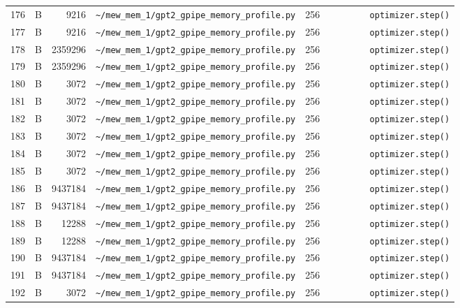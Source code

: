\documentclass{article}
\begin{document}
\begin{longtable}{r l r p{6.5cm} r p{7.0cm}}
176 & B & 9216 & \lstinline|~/mew_mem_1/gpt2_gpipe_memory_profile.py| & 256 & \lstinline|        optimizer.step()| \\
177 & B & 9216 & \lstinline|~/mew_mem_1/gpt2_gpipe_memory_profile.py| & 256 & \lstinline|        optimizer.step()| \\
178 & B & 2359296 & \lstinline|~/mew_mem_1/gpt2_gpipe_memory_profile.py| & 256 & \lstinline|        optimizer.step()| \\
179 & B & 2359296 & \lstinline|~/mew_mem_1/gpt2_gpipe_memory_profile.py| & 256 & \lstinline|        optimizer.step()| \\
180 & B & 3072 & \lstinline|~/mew_mem_1/gpt2_gpipe_memory_profile.py| & 256 & \lstinline|        optimizer.step()| \\
181 & B & 3072 & \lstinline|~/mew_mem_1/gpt2_gpipe_memory_profile.py| & 256 & \lstinline|        optimizer.step()| \\
182 & B & 3072 & \lstinline|~/mew_mem_1/gpt2_gpipe_memory_profile.py| & 256 & \lstinline|        optimizer.step()| \\
183 & B & 3072 & \lstinline|~/mew_mem_1/gpt2_gpipe_memory_profile.py| & 256 & \lstinline|        optimizer.step()| \\
184 & B & 3072 & \lstinline|~/mew_mem_1/gpt2_gpipe_memory_profile.py| & 256 & \lstinline|        optimizer.step()| \\
185 & B & 3072 & \lstinline|~/mew_mem_1/gpt2_gpipe_memory_profile.py| & 256 & \lstinline|        optimizer.step()| \\
186 & B & 9437184 & \lstinline|~/mew_mem_1/gpt2_gpipe_memory_profile.py| & 256 & \lstinline|        optimizer.step()| \\
187 & B & 9437184 & \lstinline|~/mew_mem_1/gpt2_gpipe_memory_profile.py| & 256 & \lstinline|        optimizer.step()| \\
188 & B & 12288 & \lstinline|~/mew_mem_1/gpt2_gpipe_memory_profile.py| & 256 & \lstinline|        optimizer.step()| \\
189 & B & 12288 & \lstinline|~/mew_mem_1/gpt2_gpipe_memory_profile.py| & 256 & \lstinline|        optimizer.step()| \\
190 & B & 9437184 & \lstinline|~/mew_mem_1/gpt2_gpipe_memory_profile.py| & 256 & \lstinline|        optimizer.step()| \\
191 & B & 9437184 & \lstinline|~/mew_mem_1/gpt2_gpipe_memory_profile.py| & 256 & \lstinline|        optimizer.step()| \\
192 & B & 3072 & \lstinline|~/mew_mem_1/gpt2_gpipe_memory_profile.py| & 256 & \lstinline|        optimizer.step()| \\

\end{longtable}
\end{document}
